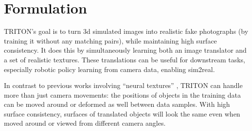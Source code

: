 \documentclass{article}
\begin{document}


\section{Formulation}
\label{sec:data}
\vspace{-3pt}
	TRITON's goal is to turn 3d simulated images into realistic fake photographs (by training it without any matching pairs), while maintaining high surface consistency.
	It does this by simultaneously learning both an image translator and a set of realistic textures.
	These translations can be useful for downstream tasks, especially robotic policy learning from camera data, enabling sim2real.
	
	In contrast to previous works involving ``neural textures'' \cite{deferred_neural_rendering,surgical_video_translation}, TRITON can handle more than just camera movements:
	the positions of objects in the training data can be moved around or deformed as well between data samples.
	With high surface consistency, surfaces of translated objects will look the same even when moved around or viewed from different camera angles.
\end{document}
